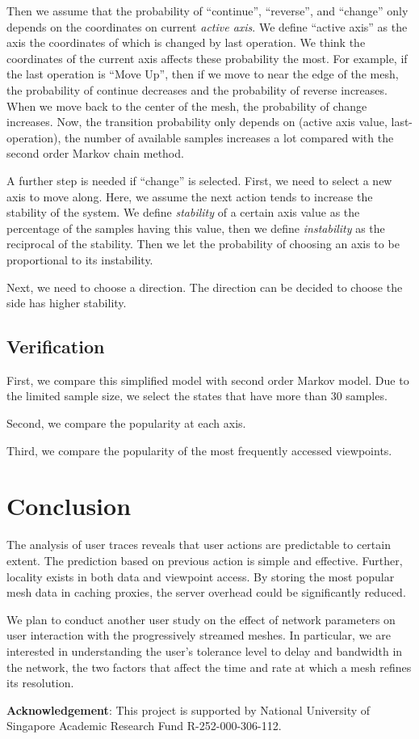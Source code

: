 Then we assume that the probability of ``continue'', ``reverse'', and ``change'' only depends on the coordinates
on current \textit{active axis}. We define ``active axis'' as the axis the coordinates of which is changed by last operation.
We think the coordinates of the current axis affects these probability the most. For example, if the last operation
is ``Move Up'', then if we move to near the edge of the mesh, the probability of continue decreases and the probability
of reverse increases. When we move back to the center of the mesh, the probability of change increases. Now, the transition
probability only depends on (active axis value, last-operation), the number of available samples increases a lot compared
with the second order Markov chain method. 

A further step is needed if ``change'' is selected. First, we need to select a new axis to move along. Here, we 
assume the next action tends to increase the stability of the system. We define \textit{stability} of a certain 
axis value as the percentage of the samples having this value, then we define \textit{instability} as the reciprocal 
of the stability. Then we let the probability of choosing an axis to be proportional to its instability.  

Next, we need to choose a direction. The direction can be decided to choose the side has higher stability. 
\subsection{Verification}
First, we compare this simplified model with second order Markov model. Due to the limited sample size, we 
select the states that have more than 30 samples. 

Second, we compare the popularity at each axis. 

Third, we compare the popularity of the most frequently accessed viewpoints.
\section{Conclusion}
The analysis of user traces reveals that 
user actions are predictable to certain extent. The
prediction based on previous action is simple and effective. 
Further, locality exists in both data and viewpoint access. By
storing the most popular mesh data in caching proxies, 
the server overhead could be significantly reduced. 

We plan to conduct another user study on the effect
of network parameters on user interaction with the progressively
streamed meshes. In particular, we are interested in understanding
the user's tolerance level to delay and bandwidth in the network,
the two factors that affect the time and rate at which a mesh 
refines its resolution.

\textbf{Acknowledgement}:
This project is supported by National University of Singapore Academic
Research Fund R-252-000-306-112.
